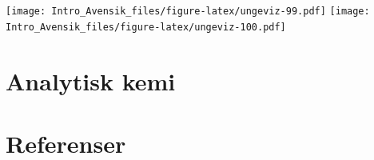 \documentclass[
]{book}
\begin{document}
\texttt{[image: Intro\_Avensik\_files/figure-latex/ungeviz-99.pdf]} \texttt{[image: Intro\_Avensik\_files/figure-latex/ungeviz-100.pdf]}

\hypertarget{analytisk-kemi}{%
\chapter{Analytisk kemi}\label{analytisk-kemi}}

\hypertarget{referenser}{%
\chapter*{Referenser}\label{referenser}}

  
\end{document}
